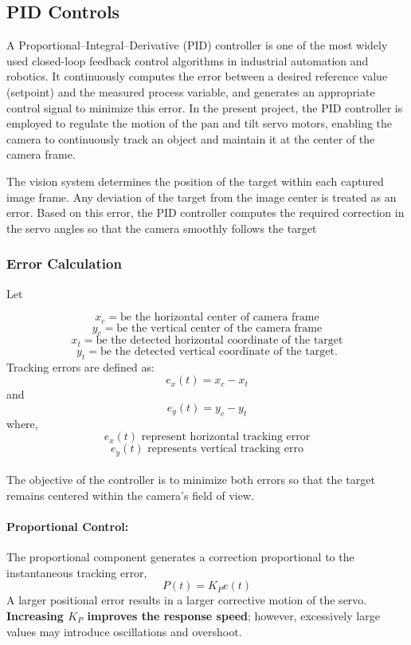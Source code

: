 \documentclass[12pt]{article}
\begin{document}
{\newpage
\subsection{PID Controls}
A Proportional–Integral–Derivative (PID) controller is one of the most widely used closed-loop feedback control algorithms in industrial automation and robotics. It continuously computes the error between a desired reference value (setpoint) and the measured process variable, and generates an appropriate control signal to minimize this error. In the present project, the PID controller is employed to regulate the motion of the pan and tilt servo motors, enabling the camera to continuously track an object and maintain it at the center of the camera frame.

The vision system determines the position of the target within each captured image frame. Any deviation of the target from the image center is treated as an error. Based on this error, the PID controller computes the required correction in the servo angles so that the camera smoothly follows the target
\subsubsection{Error Calculation}
Let

\[x_c = \text{be the horizontal center of camera frame}\]
\[y_c = \text{be the vertical center of the camera frame}\]
\[x_t = \text{be the detected horizontal coordinate of the target}\]
\[y_t = \text{be the detected vertical coordinate of the target.}\]
Tracking errors are defined as:
\begin{equation}
e_x(t)=x_c-x_t
\end{equation}
and
\begin{equation}
e_y(t)=y_c-y_t
\end{equation}
where,
\[e_x(t) \text{ represent horizontal tracking error}\]
\[e_y(t) \text{ represents vertical tracking erro}\] \\

The objective of the controller is to minimize both errors so that the target remains centered within the camera's field of view.
\newpage
\paragraph{Proportional Control:}
The proportional component generates a correction proportional to the instantaneous tracking error,
\begin{equation}
P(t)=K_Pe(t)
\label{eq:proportional}
\end{equation}
A larger positional error results in a larger corrective motion of the servo. \textbf{Increasing $K_P$ improves the response speed}; however, excessively large values may introduce oscillations and overshoot.
}
\end{document}
